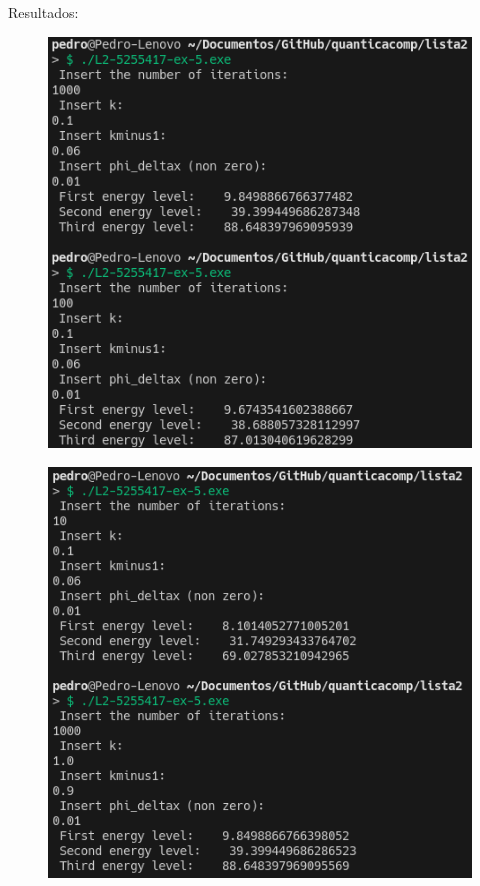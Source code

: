 \documentclass[12pt, a4paper]{article} %
\begin{document}
        Resultados:
        \begin{figure}[H]    
            \centering
            \includegraphics[scale=0.8]{../images/results-ex5-1.png}
            \caption{}
        \end{figure}
        \begin{figure}[H]    
            \centering
            \includegraphics[scale=0.8]{../images/results-ex5-2.png}
            \caption{}
        \end{figure}
\end{document}
